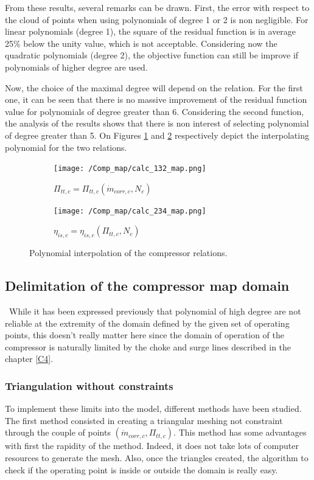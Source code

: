From these results, several remarks can be drawn. First, the error with respect to the cloud of points when using polynomials of degree 1 or 2 is non negligible. For linear polynomials (degree 1), the square of the residual function is in average 25\% below the unity value, which is not acceptable. Considering now the quadratic polynomials (degree 2), the objective function can still be improve if polynomials of higher degree are used.

Now, the choice of the maximal degree will depend on the relation. For the first one, it can be seen that there is no massive improvement of the residual function value for polynomials of degree greater than 6. Considering the second function, the analysis of the results shows that there is non interest of selecting polynomial of degree greater than 5.
On Figures \ref{fig:C7_polycomp1} and \ref{fig:C7_polycomp2} respectively depict the interpolating polynomial for the two relations.
\begin{figure}[h]
    \centering
    \begin{subfigure}[b]{0.4\textwidth}
        \centering
        \texttt{[image: /Comp\_map/calc\_132\_map.png]}
        \caption{$\Pi_{tt,c} = \Pi_{tt,c}(\dot{m}_{corr,c},N_c)$}
        \label{fig:C7_polycomp1}
    \end{subfigure}
    \begin{subfigure}[b]{0.4\textwidth}
        \centering
        \texttt{[image: /Comp\_map/calc\_234\_map.png]}
        \caption{$\eta_{is,c} = \eta_{is,c}(\Pi_{tt,c},N_c)$}
        \label{fig:C7_polycomp2}
    \end{subfigure}
    \caption{Polynomial interpolation of the compressor relations.} \label{fig:C7_polycomp}
\end{figure}

\subsection{Delimitation of the compressor map domain}
\quad\ While it has been expressed previously that polynomial of high degree are not reliable at the extremity of the domain defined by the given set of operating points, this doesn't really matter here since the domain of operation of the compressor is naturally limited by the choke and surge lines described in the chapter \ref{C4}.

\subsubsection{Triangulation without constraints}
To implement these limits into the model, different methods have been studied. The first method consisted in creating a triangular meshing not constraint through the couple of points $(\dot{m}_{corr,c},\Pi_{tt,c})$. This method has some advantages with first the rapidity of the method. Indeed, it does not take lots of computer resources to generate the mesh. Also, once the triangles created, the algorithm to check if the operating point is inside or outside the domain is really easy.

